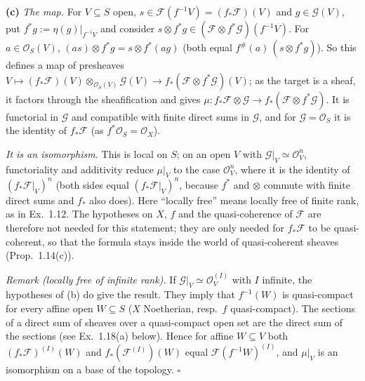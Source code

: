 \documentclass[11pt]{article}
\begin{document}
\textbf{(c)} \emph{The map.} For $V\subseteq S$ open, $s\in\mathcal F(f^{-1}V)=(f_*\mathcal F)(V)$ and $g\in\mathcal G(V)$, put $f^*g:=\eta(g)|_{f^{-1}V}$ and consider $s\otimes f^*g\in(\mathcal F\otimes f^*\mathcal G)(f^{-1}V)$. For $a\in\mathcal O_S(V)$, $(as)\otimes f^*g=s\otimes f^*(ag)$ (both equal $f^\#(a)\,(s\otimes f^*g)$). So this defines a map of presheaves $V\mapsto(f_*\mathcal F)(V)\otimes_{\mathcal O_S(V)}\mathcal G(V)\to f_*(\mathcal F\otimes f^*\mathcal G)(V)$; as the target is a sheaf, it factors through the sheafification and gives $\mu:f_*\mathcal F\otimes\mathcal G\to f_*(\mathcal F\otimes f^*\mathcal G)$. It is functorial in $\mathcal G$ and compatible with finite direct sums in $\mathcal G$, and for $\mathcal G=\mathcal O_S$ it is the identity of $f_*\mathcal F$ (as $f^*\mathcal O_S=\mathcal O_X$).

\emph{It is an isomorphism.} This is local on $S$; on an open $V$ with $\mathcal G|_V\simeq\mathcal O_V^n$, functoriality and additivity reduce $\mu|_V$ to the case $\mathcal O_V^n$, where it is the identity of $(f_*\mathcal F|_V)^n$ (both sides equal $(f_*\mathcal F|_V)^n$, because $f^*$ and $\otimes$ commute with finite direct sums and $f_*$ also does). Here ``locally free'' means locally free of finite rank, as in Ex.~1.12. The hypotheses on $X$, $f$ and the quasi-coherence of $\mathcal F$ are therefore not needed for this statement; they are only needed for $f_*\mathcal F$ to be quasi-coherent, so that the formula stays inside the world of quasi-coherent sheaves (Prop.~1.14(c)).

\emph{Remark (locally free of infinite rank).} If $\mathcal G|_V\simeq\mathcal O_V^{(I)}$ with $I$ infinite, the hypotheses of (b) do give the result. They imply that $f^{-1}(W)$ is quasi-compact for every affine open $W\subseteq S$ ($X$ Noetherian, resp.\ $f$ quasi-compact). The sections of a direct sum of sheaves over a quasi-compact open set are the direct sum of the sections (see Ex.~1.18(a) below). Hence for affine $W\subseteq V$ both $(f_*\mathcal F)^{(I)}(W)$ and $f_*(\mathcal F^{(I)})(W)$ equal $\mathcal F(f^{-1}W)^{(I)}$, and $\mu|_V$ is an isomorphism on a base of the topology. \hfill$\square$
\end{document}
